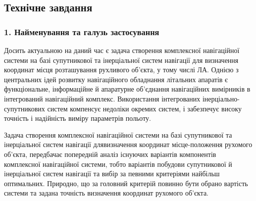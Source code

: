 % 
% 
% 
% 


\subsection*{Технічне завдання}

\subsubsection*{1. Найменування та галузь застосування}

% 


Досить актуальною на даний час є задача створення комплексної навігаційної системи на базі супутникової та інерціальної систем навігації для визначення координат місця розташування рухливого об’єкта, у тому числі ЛА. Однією з центральних ідей розвитку навігаційного обладнання літальних апаратів  є функціональне, інформаційне й апаратурне об'єднання навігаційних вимірників в інтегрований навігаційний комплекс. Використання інтегрованих інерціально-супутникових систем компенсує недоліки окремих систем, і забезпечує високу точність і надійність виміру параметрів польоту.

Задача створення комплексної навігаційної системи на базі супутникової та інерціальної систем навігації длявизначення координат місце-положення рухомого об'єкта, передбачає попередній аналіз існуючих варіантів компонентів комплексної навігаційної системи, тобто варіантів побудови супутникової й  інерціальної систем навігації та вибір за певними критеріями найбільш оптимальних. Природно, що за головний критерій повинно бути обрано вартість системи та задана точність визначення координат рухомого об’єкта.

